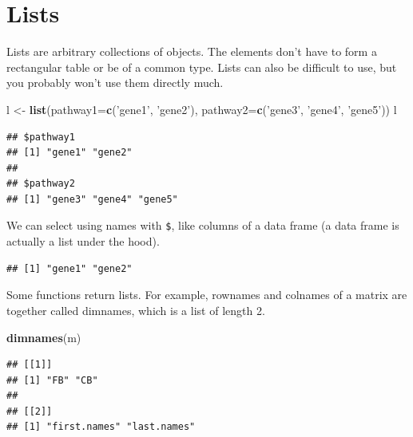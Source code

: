 \documentclass[]{article}
\newenvironment{Shaded}{\begin{snugshade}}{\end{snugshade}}
\newcommand{\KeywordTok}[1]{\textcolor[rgb]{0.13,0.29,0.53}{\textbf{#1}}}
\newcommand{\DataTypeTok}[1]{\textcolor[rgb]{0.13,0.29,0.53}{#1}}
\newcommand{\StringTok}[1]{\textcolor[rgb]{0.31,0.60,0.02}{#1}}
\newcommand{\OperatorTok}[1]{\textcolor[rgb]{0.81,0.36,0.00}{\textbf{#1}}}
\newcommand{\NormalTok}[1]{#1}
\begin{document}
\section{Lists}\label{lists}

Lists are arbitrary collections of objects. The elements don't have to
form a rectangular table or be of a common type. Lists can also be
difficult to use, but you probably won't use them directly much.

\begin{Shaded}
\begin{Highlighting}[]
\NormalTok{l <-}\StringTok{ }\KeywordTok{list}\NormalTok{(}\DataTypeTok{pathway1=}\KeywordTok{c}\NormalTok{(}\StringTok{'gene1'}\NormalTok{, }\StringTok{'gene2'}\NormalTok{), }\DataTypeTok{pathway2=}\KeywordTok{c}\NormalTok{(}\StringTok{'gene3'}\NormalTok{, }\StringTok{'gene4'}\NormalTok{, }\StringTok{'gene5'}\NormalTok{))}
\NormalTok{l}
\end{Highlighting}
\end{Shaded}

\begin{verbatim}
## $pathway1
## [1] "gene1" "gene2"
## 
## $pathway2
## [1] "gene3" "gene4" "gene5"
\end{verbatim}

We can select using names with \texttt{\$}, like columns of a data frame
(a data frame is actually a list under the hood).

\begin{Shaded}
\end{Shaded}

\begin{verbatim}
## [1] "gene1" "gene2"
\end{verbatim}

Some functions return lists. For example, rownames and colnames of a
matrix are together called dimnames, which is a list of length 2.

\begin{Shaded}
\begin{Highlighting}[]
\KeywordTok{dimnames}\NormalTok{(m)}
\end{Highlighting}
\end{Shaded}

\begin{verbatim}
## [[1]]
## [1] "FB" "CB"
## 
## [[2]]
## [1] "first.names" "last.names"
\end{verbatim}
\end{document}
